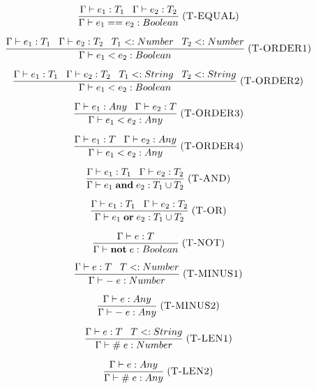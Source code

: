 \documentclass[12pt]{article}
\newcommand{\mylabel}[1]{\; (\textsc{#1})}
\newcommand{\subtype}{<:}
\newcommand{\kw}[1]{\mathbf{#1} \;}
\newcommand{\env}{\Gamma}
\begin{document}
\[
\frac{\env \vdash e_{1}:T_{1} \;\;\;
      \env \vdash e_{2}:T_{2}}
     {\env \vdash e_{1} == e_{2} : Boolean}
\mylabel{T-EQUAL}
\]

\[
\frac{\env \vdash e_{1}:T_{1} \;\;\;
      \env \vdash e_{2}:T_{2} \;\;\;
      T_{1} \subtype Number \;\;\;
      T_{2} \subtype Number}
     {\env \vdash e_{1} < e_{2} : Boolean}
\mylabel{T-ORDER1}
\]

\[
\frac{\env \vdash e_{1}:T_{1} \;\;\;
      \env \vdash e_{2}:T_{2} \;\;\;
      T_{1} \subtype String \;\;\;
      T_{2} \subtype String}
     {\env \vdash e_{1} < e_{2} : Boolean}
\mylabel{T-ORDER2}
\]

\[
\frac{\env \vdash e_{1}:Any \;\;\;
      \env \vdash e_{2}:T}
     {\env \vdash e_{1} < e_{2} : Any}
\mylabel{T-ORDER3}
\]

\[
\frac{\env \vdash e_{1}:T \;\;\;
      \env \vdash e_{2}:Any}
     {\env \vdash e_{1} < e_{2} : Any}
\mylabel{T-ORDER4}
\]

\[
\frac{\env \vdash e_{1}:T_{1} \;\;\;
      \env \vdash e_{2}:T_{2}}
     {\env \vdash e_{1} \; \kw{and} e_{2} : T_{1} \cup T_{2}}
\mylabel{T-AND}
\]

\[
\frac{\env \vdash e_{1}:T_{1} \;\;\;
      \env \vdash e_{2}:T_{2}}
     {\env \vdash e_{1} \; \kw{or} e_{2} : T_{1} \cup T_{2}}
\mylabel{T-OR}
\]

\[
\frac{\env \vdash e:T}
     {\env \vdash \kw{not} e : Boolean}
\mylabel{T-NOT}
\]

\[
\frac{\env \vdash e:T \;\;\;
      T \subtype Number}
     {\env \vdash - \; e : Number}
\mylabel{T-MINUS1}
\]

\[
\frac{\env \vdash e:Any}
     {\env \vdash - \; e : Any}
\mylabel{T-MINUS2}
\]

\[
\frac{\env \vdash e:T \;\;\;
      T \subtype String}
     {\env \vdash \# \; e : Number}
\mylabel{T-LEN1}
\]

\[
\frac{\env \vdash e:Any}
     {\env \vdash \# \; e : Any}
\mylabel{T-LEN2}
\]
\end{document}
